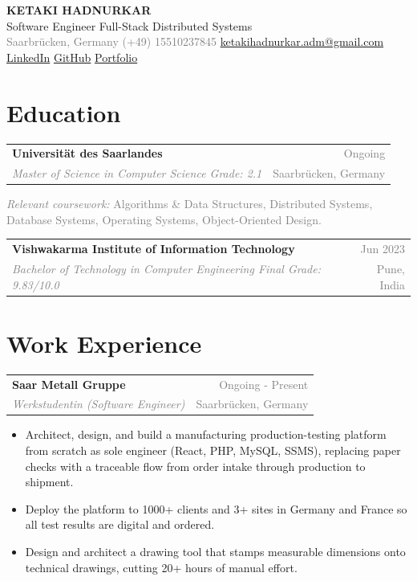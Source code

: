 \documentclass[10pt, letterpaper]{article}
\makeatletter
\newcommand{\resumeEntry}[4]{%
  \vspace{2pt}%
  \noindent
  \begin{tabularx}{\linewidth}{@{}X r@{}}
    \textbf{#1} & \textcolor{gray}{\small #2} \\[-1pt]
    \textit{\textcolor{gray}{\small #3}} & \textcolor{gray}{\small #4}
  \end{tabularx}%
}
\makeatother
\begin{document}
\begin{center}
  {\Large\bfseries\color{accent} KETAKI HADNURKAR}\\[3pt]
  {\small\color{gray} Software Engineer \textbar{} Full-Stack \textbar{} Distributed Systems}\\[4pt]
  \textcolor{gray}{\small
    Saarbr\"ucken, Germany \textbar{}
    (+49) 15510237845 \textbar{}
    \href{mailto:ketakihadnurkar.adm@gmail.com}{ketakihadnurkar.adm@gmail.com} \textbar{}
    \href{https://www.linkedin.com/in/ketaki-hadnurkar}{LinkedIn} \textbar{}
    \href{https://github.com/Ketaki1806}{GitHub} \textbar{}
    \href{https://ketaki1806.github.io/}{Portfolio}
  }
\end{center}

\vspace{1pt}

\section{Education}

\resumeEntry{Universit\"at des Saarlandes}{Ongoing}
  {Master of Science in Computer Science \textbar{} Grade: 2.1}{Saarbr\"ucken, Germany}
\textcolor{gray}{\small \textit{Relevant coursework:} Algorithms \& Data Structures, Distributed Systems, Database Systems, Operating Systems, Object-Oriented Design.}

\vspace{1pt}

\resumeEntry{Vishwakarma Institute of Information Technology}{Jun 2023}
  {Bachelor of Technology in Computer Engineering \textbar{} Final Grade: 9.83/10.0}{Pune, India}

\section{Work Experience}

\resumeEntry{Saar Metall Gruppe}{Ongoing - Present}
  {Werkstudentin (Software Engineer)}{Saarbr\"ucken, Germany}
\begin{itemize}
  \item Architect, design, and build a manufacturing production-testing platform from scratch as sole engineer (React, PHP, MySQL, SSMS), replacing paper checks with a traceable flow from order intake through production to shipment.
  \item Deploy the platform to 1000+ clients and 3+ sites in Germany and France so all test results are digital and ordered.
  \item Design and architect a drawing tool that stamps measurable dimensions onto technical drawings, cutting 20+ hours of manual effort.
\end{itemize}
\end{document}
